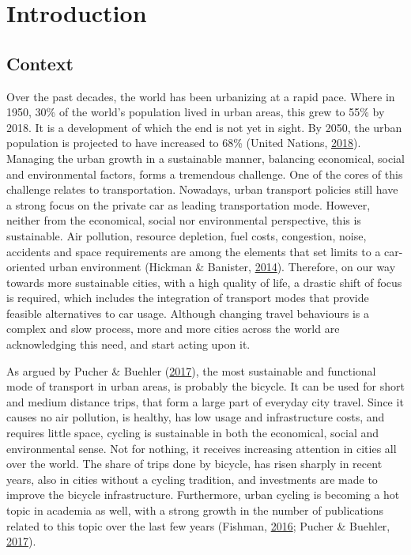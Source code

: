 \documentclass[12pt,oneside]{reedthesis}
\begin{document}
\chapter{Introduction}\label{introduction}

\section{Context}\label{context}

Over the past decades, the world has been urbanizing at a rapid pace.
Where in 1950, 30\% of the world's population lived in urban areas, this
grew to 55\% by 2018. It is a development of which the end is not yet in
sight. By 2050, the urban population is projected to have increased to
68\% (United Nations, \protect\hyperlink{ref-un2018}{2018}). Managing
the urban growth in a sustainable manner, balancing economical, social
and environmental factors, forms a tremendous challenge. One of the
cores of this challenge relates to transportation. Nowadays, urban
transport policies still have a strong focus on the private car as
leading transportation mode. However, neither from the economical,
social nor environmental perspective, this is sustainable. Air
pollution, resource depletion, fuel costs, congestion, noise, accidents
and space requirements are among the elements that set limits to a
car-oriented urban environment (Hickman \& Banister,
\protect\hyperlink{ref-hickman2014}{2014}). Therefore, on our way
towards more sustainable cities, with a high quality of life, a drastic
shift of focus is required, which includes the integration of transport
modes that provide feasible alternatives to car usage. Although changing
travel behaviours is a complex and slow process, more and more cities
across the world are acknowledging this need, and start acting upon it.

As argued by Pucher \& Buehler
(\protect\hyperlink{ref-pucher2017}{2017}), the most sustainable and
functional mode of transport in urban areas, is probably the bicycle. It
can be used for short and medium distance trips, that form a large part
of everyday city travel. Since it causes no air pollution, is healthy,
has low usage and infrastructure costs, and requires little space,
cycling is sustainable in both the economical, social and environmental
sense. Not for nothing, it receives increasing attention in cities all
over the world. The share of trips done by bicycle, has risen sharply in
recent years, also in cities without a cycling tradition, and
investments are made to improve the bicycle infrastructure. Furthermore,
urban cycling is becoming a hot topic in academia as well, with a strong
growth in the number of publications related to this topic over the last
few years (Fishman, \protect\hyperlink{ref-fishman2016}{2016}; Pucher \&
Buehler, \protect\hyperlink{ref-pucher2017}{2017}).
\end{document}
